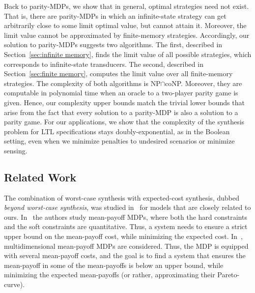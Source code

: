 \documentclass[runningheads,a4paper]{llncs}
\begin{document}
Back to parity-MDPs, we show that in general, optimal strategies need not exist. That is, there are parity-MDPs in which an infinite-state strategy can get arbitrarily close to some limit optimal value, but cannot attain it. Moreover, the limit value cannot be approximated by finite-memory strategies.  Accordingly, our solution to parity-MDPs suggests two algorithms. The first, described in Section~\ref{sec:infinite memory}, finds the limit value of all possible strategies, which corresponds to infinite-state transducers. The second, described in Section~\ref{sec:finite memory}, computes the limit value over all finite-memory strategies. 
The complexity of both algorithms is NP$\cap$coNP. Moreover, they are computable in polynomial time when an oracle to a two-player parity game is given.
Hence, our complexity upper bounds match the trivial lower bounds that arise from the fact that every solution to a parity-MDP is also a solution to a parity game.
For our applications, we show that the complexity of the synthesis problem for LTL specifications stays doubly-exponential, as in the Boolean setting, even when we minimize penalties to undesired scenarios or minimize  sensing.

\vspace*{-10pt}
\subsection{Related Work}
\label{related}
The combination of worst-case synthesis with expected-cost synthesis, dubbed {\em beyond worst-case synthesis\/}, was studied in~\cite{BFRR14a,CR15} for models that are closely related to ours. 
In~\cite{BFRR14a} the authors study mean-payoff MDPs, where both the hard constraints and the soft constraints are quantitative. Thus, a system needs to ensure a strict upper bound on the mean-payoff cost, while minimizing the expected cost. 
In~\cite{CR15}, multidimensional mean-payoff MDPs are considered. Thus, the MDP is equipped with several mean-payoff costs, and the goal is to find a system that ensures the mean-payoff in some of the mean-payoffs is below an upper bound, while minimizing the expected mean-payoffs (or rather, approximating their Pareto-curve).
 
\end{document}
